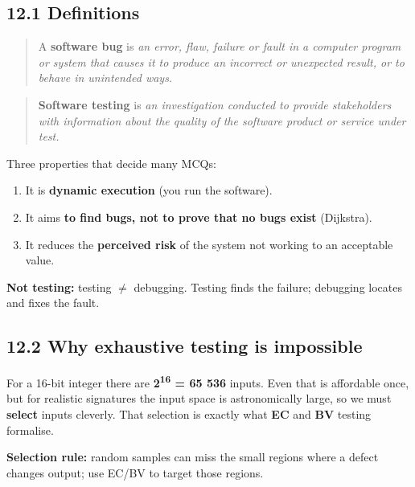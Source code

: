 \begin{studycolumns}
\vspace{0pt}



\subsection*{12.1 Definitions}

\begin{quote}\small\color{navy}
A \textbf{software bug} is \emph{an error, flaw, failure or fault in a computer program or system that causes it to produce an incorrect or unexpected result, or to behave in unintended ways.}

\end{quote}


\begin{quote}\small\color{navy}
\textbf{Software testing} is \emph{an investigation conducted to provide stakeholders with information about the quality of the software product or service under test.}

\end{quote}
Three properties that decide many MCQs:

\begin{enumerate}
\item It is \textbf{dynamic execution} (you run the software).
\item It aims \textbf{to find bugs, not to prove that no bugs exist} (Dijkstra).
\item It reduces the \textbf{perceived risk} of the system not working to an acceptable value.
\end{enumerate}
\textbf{Not testing:} testing \ensuremath{\neq} debugging. Testing finds the failure; debugging locates and fixes the fault.

\subsection*{12.2 Why exhaustive testing is impossible}
For a 16-bit integer there are \textbf{2\textsuperscript{1}\textsuperscript{6} = 65 536} inputs. Even that is affordable once, but for realistic signatures the input space is astronomically large, so we must \textbf{select} inputs cleverly. That selection is exactly what \textbf{EC} and \textbf{BV} testing formalise.

\textbf{Selection rule:} random samples can miss the small regions where a defect changes output; use EC/BV to target those regions.
\end{studycolumns}

